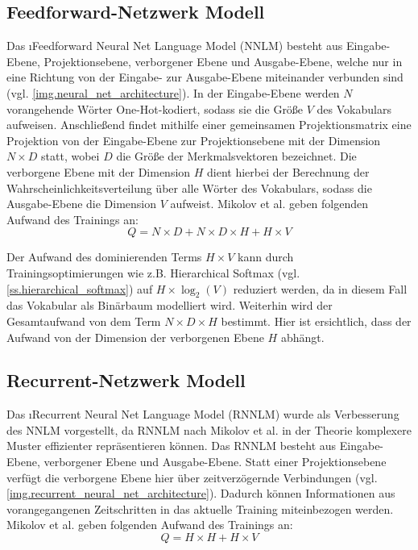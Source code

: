 \subsection{Feedforward-Netzwerk Modell}\label{ss.nnlm}
Das \i{Feedforward Neural Net Language Model} (NNLM) besteht aus Eingabe-Ebene, Projektionsebene, verborgener Ebene und Ausgabe-Ebene, welche nur in eine Richtung von der Eingabe- zur Ausgabe-Ebene miteinander verbunden sind (vgl. \autoref{img.neural_net_architecture}). In der Eingabe-Ebene werden $N$ vorangehende Wörter One-Hot-kodiert, sodass sie die Größe $V$ des Vokabulars aufweisen. Anschließend findet mithilfe einer gemeinsamen Projektionsmatrix eine Projektion von der Eingabe-Ebene zur Projektionsebene mit der Dimension $N \times D$ statt, wobei $D$ die Größe der Merkmalsvektoren bezeichnet. Die verborgene Ebene mit der Dimension $H$ dient hierbei der Berechnung der Wahrscheinlichkeitsverteilung über alle Wörter des Vokabulars, sodass die Ausgabe-Ebene die Dimension $V$ aufweist. Mikolov et al. geben folgenden Aufwand des Trainings an:
\begin{equation}
    Q = N \times D + N \times D \times H + H \times V \label{eq.complexitiy_nnlm}
\end{equation}

Der Aufwand des dominierenden Terms $H \times V$ kann durch Trainingsoptimierungen wie z.B. Hierarchical Softmax (vgl. \autoref{ss.hierarchical_softmax}) auf $H \times \log_2(V)$ reduziert werden, da in diesem Fall das Vokabular als Binärbaum modelliert wird. Weiterhin wird der Gesamtaufwand von dem Term $N \times D \times H$ bestimmt. Hier ist ersichtlich, dass der Aufwand von der Dimension der verborgenen Ebene $H$ abhängt.

\subsection{Recurrent-Netzwerk Modell}\label{ss.rnnlm}
Das \i{Recurrent Neural Net Language Model} (RNNLM) wurde als Verbesserung des NNLM vorgestellt, da RNNLM nach Mikolov et al. in der Theorie komplexere Muster effizienter repräsentieren können. Das RNNLM besteht aus Eingabe-Ebene, verborgener Ebene und Ausgabe-Ebene. Statt einer Projektionsebene verfügt die verborgene Ebene hier über zeitverzögernde Verbindungen (vgl. \autoref{img.recurrent_neural_net_architecture}). Dadurch können Informationen aus vorangegangenen Zeitschritten in das aktuelle Training miteinbezogen werden. Mikolov et al. geben folgenden Aufwand des Trainings an:
\begin{equation}
    Q = H \times H + H \times V \label{eq.complexitiy_rnnlm}
\end{equation}

